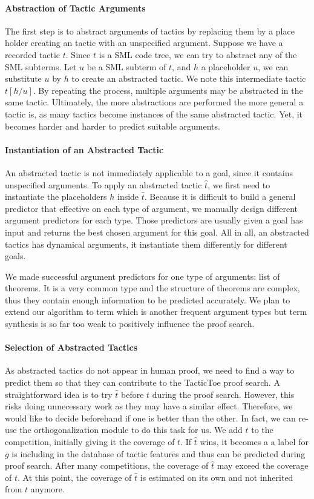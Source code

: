 \documentclass[runningheads,a4paper,draft]{svjour3}
\def\sml{\textsf{SML}\xspace}
\def\tactictoe{\textsf{TacticToe}\xspace}
\begin{document}
\paragraph{Abstraction of Tactic Arguments}
The first step is to abstract arguments of tactics by replacing them by a 
place holder creating an tactic with an unspecified argument.
Suppose we have a recorded tactic $t$. Since $t$ is a \sml code tree, we can 
try to abstract any of the 
\sml subterms. Let $u$ be a \sml subterm of $t$, and $h$ a placeholder $u$, we 
can substitute $u$ by $h$ to create an abstracted tactic.
We note this intermediate tactic $t[h/u]$. By repeating the 
process, multiple 
arguments may be abstracted in the same tactic. Ultimately, the more 
abstractions are performed the more general a tactic is, as many tactics 
become instances of the same abstracted tactic. Yet, it becomes harder and 
harder to predict suitable arguments. 

\paragraph{Instantiation of an Abstracted Tactic}
An abstracted tactic is not immediately applicable to a goal, since it contains
unspecified arguments. To apply an abstracted tactic $\hat{t}$, we first need 
to 
instantiate the placeholders $h$ inside $\hat{t}$. Because it is difficult to 
build a general predictor that effective on each type of argument, we manually 
design different argument predictors for each type. Those predictors are 
usually given a goal has input and returns the best chosen argument for this 
goal. All in all, an abstracted tactics has 
dynamical arguments, it instantiate them differently for different goals. 

We made successful argument predictors for one type of arguments: list 
of theorems. It is a very common type and the structure of theorems 
are complex, thus they contain enough information to be predicted accurately. 
We plan to extend our algorithm to term which is another frequent argument 
types but term synthesis is so far too weak to positively 
influence the proof search.

\paragraph{Selection of Abstracted Tactics}
As abstracted tactics do not appear in human proof, we need to find a way to 
predict them so that they can contribute to the \tactictoe proof search.
A straightforward idea is to try $\hat{t}$ before $t$ during the proof search. 
However, this risks doing unnecessary work as they may have a similar effect. 
Therefore, we would like to decide 
beforehand if one is better than the other.
In fact, we can re-use the orthogonalization module to do this task for us.
We add $\hat{t}$ to the competition, initially giving it the coverage of $t$. 
If $\hat{t}$ 
wins, it becomes a a label for $g$ is including in the database of tactic 
features and thus can be predicted during proof search.
After many competitions, the coverage of $\hat{t}$ may exceed the coverage of 
$t$. At 
this point, the coverage of $\hat{t}$ is estimated on its own and not inherited 
from 
$t$ anymore.
\end{document}

